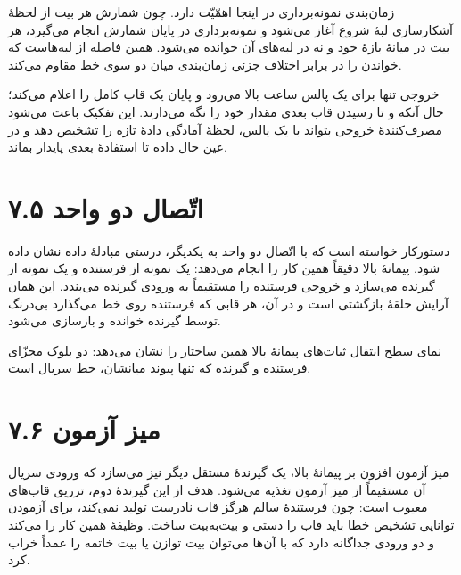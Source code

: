 \documentclass[12pt,a4paper]{article}
\begin{document}
	زمان‌بندی نمونه‌برداری در اینجا اهمّیّت دارد. چون شمارش هر بیت از لحظهٔ آشکارسازی لبهٔ شروع آغاز می‌شود و نمونه‌برداری در پایان شمارش انجام می‌گیرد، هر بیت در میانهٔ بازهٔ خود و نه در لبه‌های آن خوانده می‌شود. همین فاصله از لبه‌هاست که خواندن را در برابر اختلاف جزئی زمان‌بندی میان دو سوی خط مقاوم می‌کند.

	خروجی  تنها برای یک پالس ساعت بالا می‌رود و پایان یک قاب کامل را اعلام می‌کند؛ حال آنکه  و  تا رسیدن قاب بعدی مقدار خود را نگه می‌دارند. این تفکیک باعث می‌شود مصرف‌کنندهٔ خروجی بتواند با یک پالس، لحظهٔ آمادگی دادهٔ تازه را تشخیص دهد و در عین حال داده تا استفادهٔ بعدی پایدار بماند.


	\section*{۷.۵ اتّصال دو واحد}
	دستورکار خواسته است که با اتّصال دو واحد به یکدیگر، درستی مبادلهٔ داده نشان داده شود. پیمانهٔ بالا دقیقاً همین کار را انجام می‌دهد: یک نمونه از فرستنده و یک نمونه از گیرنده می‌سازد و خروجی  فرستنده را مستقیماً به ورودی  گیرنده می‌بندد. این همان آرایش حلقهٔ بازگشتی است و در آن، هر قابی که فرستنده روی خط می‌گذارد بی‌درنگ توسط گیرنده خوانده و بازسازی می‌شود.


	نمای سطح انتقال ثبات‌های پیمانهٔ بالا همین ساختار را نشان می‌دهد: دو بلوک مجزّای فرستنده و گیرنده که تنها پیوند میانشان، خط سریال است.


	\section*{۷.۶ میز آزمون}
	میز آزمون افزون بر پیمانهٔ بالا، یک گیرندهٔ مستقل دیگر نیز می‌سازد که ورودی سریال آن مستقیماً از میز آزمون تغذیه می‌شود. هدف از این گیرندهٔ دوم، تزریق قاب‌های معیوب است: چون فرستندهٔ سالم هرگز قاب نادرست تولید نمی‌کند، برای آزمودن توانایی تشخیص خطا باید قاب را دستی و بیت‌به‌بیت ساخت. وظیفهٔ  همین کار را می‌کند و دو ورودی جداگانه دارد که با آن‌ها می‌توان بیت توازن یا بیت خاتمه را عمداً خراب کرد.
\end{document}

